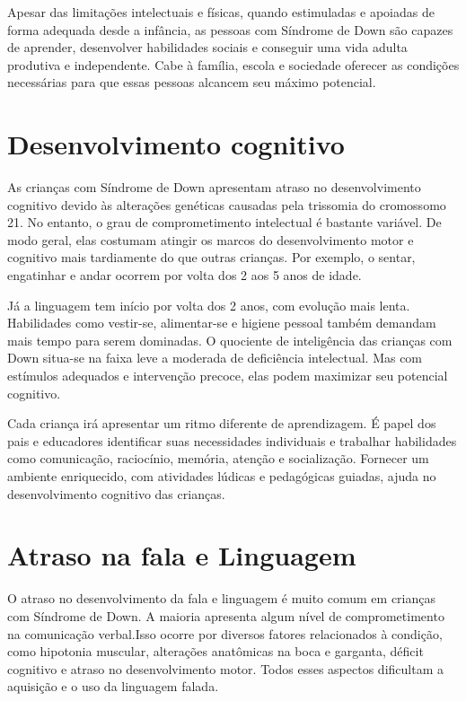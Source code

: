 Apesar das limitações intelectuais e físicas, quando estimuladas e apoiadas de forma adequada desde a infância, as pessoas com Síndrome de Down são capazes de aprender, desenvolver habilidades sociais e conseguir uma vida adulta produtiva e independente. Cabe à família, escola e sociedade oferecer as condições necessárias para que essas pessoas alcancem seu máximo potencial.

\section{Desenvolvimento cognitivo}

As crianças com Síndrome de Down apresentam atraso no desenvolvimento cognitivo devido às alterações genéticas causadas pela trissomia do cromossomo 21. No entanto, o grau de comprometimento intelectual é bastante variável. De modo geral, elas costumam atingir os marcos do desenvolvimento motor e cognitivo mais tardiamente do que outras crianças. Por exemplo, o sentar, engatinhar e andar ocorrem por volta dos 2 aos 5 anos de idade. 

Já a linguagem tem início por volta dos 2 anos, com evolução mais lenta. Habilidades como vestir-se, alimentar-se e higiene pessoal também demandam mais tempo para serem dominadas. O quociente de inteligência das crianças com Down situa-se na faixa leve a moderada de deficiência intelectual. Mas com estímulos adequados e intervenção precoce, elas podem maximizar seu potencial cognitivo.

Cada criança irá apresentar um ritmo diferente de aprendizagem. É papel dos pais e educadores identificar suas necessidades individuais e trabalhar habilidades como comunicação, raciocínio, memória, atenção e socialização. Fornecer um ambiente enriquecido, com atividades lúdicas e pedagógicas guiadas, ajuda no desenvolvimento cognitivo das crianças.

\section{Atraso na fala e Linguagem}

O atraso no desenvolvimento da fala e linguagem é muito comum em crianças com Síndrome de Down. A maioria apresenta algum nível de comprometimento na comunicação verbal.Isso ocorre por diversos fatores relacionados à condição, como hipotonia muscular, alterações anatômicas na boca e garganta, déficit cognitivo e atraso no desenvolvimento motor. Todos esses aspectos dificultam a aquisição e o uso da linguagem falada.

